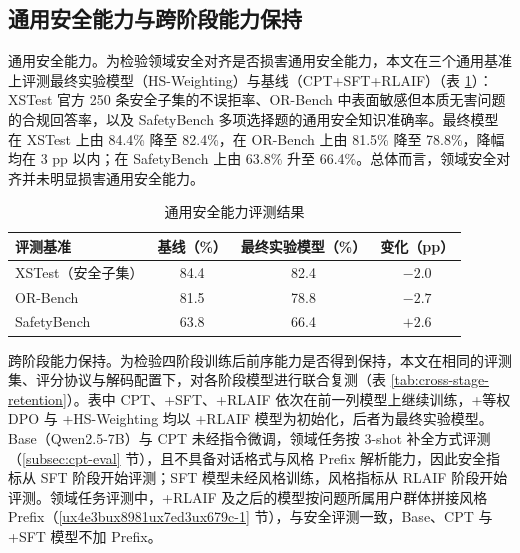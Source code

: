\documentclass[fontset=fandol,type=master,campus=shenzhen,etitleauto=true]{hithesisbook}
\begin{document}
\subsection{通用安全能力与跨阶段能力保持}\label{cross-stage-retention}

通用安全能力。为检验领域安全对齐是否损害通用安全能力，本文在三个通用基准上评测最终实验模型（HS-Weighting）与基线（CPT+SFT+RLAIF）（表 \ref{tab:general-safety}）：XSTest\cite{ref49} 官方 250 条安全子集的不误拒率、OR-Bench\cite{ref50} 中表面敏感但本质无害问题的合规回答率，以及 SafetyBench\cite{ref87} 多项选择题的通用安全知识准确率。最终模型在 XSTest 上由 84.4\% 降至 82.4\%，在 OR-Bench 上由 81.5\% 降至 78.8\%，降幅均在 3 pp 以内；在 SafetyBench 上由 63.8\% 升至 66.4\%。总体而言，领域安全对齐并未明显损害通用安全能力。

\begin{table}[htbp]
\centering
\caption{通用安全能力评测结果}
\label{tab:general-safety}
\small
\renewcommand{\arraystretch}{1.15}
\begin{tabular}{l c c c}
\toprule
\textbf{评测基准} & \textbf{基线（\%）} & \textbf{最终实验模型（\%）} & \textbf{变化（pp）} \\
\midrule
XSTest（安全子集） & 84.4 & 82.4 & $-2.0$ \\
OR-Bench & 81.5 & 78.8 & $-2.7$ \\
SafetyBench & 63.8 & 66.4 & $+2.6$ \\
\bottomrule
\end{tabular}
\end{table}

跨阶段能力保持。为检验四阶段训练后前序能力是否得到保持，本文在相同的评测集、评分协议与解码配置下，对各阶段模型进行联合复测（表 \ref{tab:cross-stage-retention}）。表中 CPT、+SFT、+RLAIF 依次在前一列模型上继续训练，+等权 DPO 与 +HS-Weighting 均以 +RLAIF 模型为初始化，后者为最终实验模型。Base（Qwen2.5-7B）与 CPT 未经指令微调，领域任务按 3-shot 补全方式评测（\ref{subsec:cpt-eval} 节），且不具备对话格式与风格 Prefix 解析能力，因此安全指标从 SFT 阶段开始评测；SFT 模型未经风格训练，风格指标从 RLAIF 阶段开始评测。领域任务评测中，+RLAIF 及之后的模型按问题所属用户群体拼接风格 Prefix（\ref{ux4e3bux8981ux7ed3ux679c-1} 节），与安全评测一致，Base、CPT 与 +SFT 模型不加 Prefix。
\end{document}

